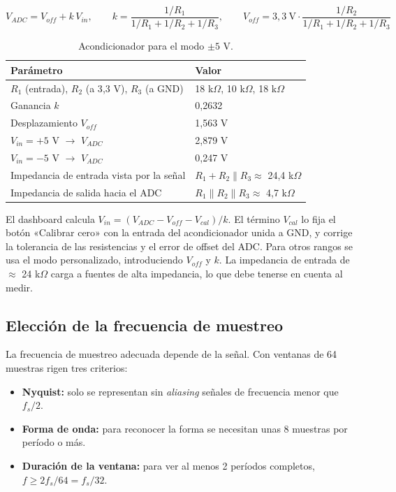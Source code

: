 \documentclass[12pt,a4paper]{article}
\begin{document}
\begin{equation}
V_{ADC} = V_{off} + k\,V_{in}, \qquad
k = \frac{1/R_1}{1/R_1 + 1/R_2 + 1/R_3}, \qquad
V_{off} = 3{,}3\ \text{V}\cdot\frac{1/R_2}{1/R_1 + 1/R_2 + 1/R_3}
\end{equation}

\begin{table}[H]
\centering
\small
\begin{tabular}{@{}p{6.0cm} p{6.0cm}@{}}
\toprule
\textbf{Parámetro} & \textbf{Valor} \\
\midrule
$R_1$ (entrada), $R_2$ (a 3{,}3 V), $R_3$ (a GND) & 18 k$\Omega$, 10 k$\Omega$, 18 k$\Omega$ \\
Ganancia $k$ & 0{,}2632 \\
Desplazamiento $V_{off}$ & 1{,}563 V \\
$V_{in} = +5$ V $\rightarrow$ $V_{ADC}$ & 2{,}879 V \\
$V_{in} = -5$ V $\rightarrow$ $V_{ADC}$ & 0{,}247 V \\
Impedancia de entrada vista por la señal & $R_1 + R_2 \parallel R_3 \approx$ 24{,}4 k$\Omega$ \\
Impedancia de salida hacia el ADC & $R_1 \parallel R_2 \parallel R_3 \approx$ 4{,}7 k$\Omega$ \\
\bottomrule
\end{tabular}
\caption{Acondicionador para el modo $\pm 5$ V.}
\end{table}

El dashboard calcula $V_{in} = (V_{ADC} - V_{off} - V_{cal}) / k$. El término $V_{cal}$ lo fija el botón «Calibrar cero» con la entrada del acondicionador unida a GND, y corrige la tolerancia de las resistencias y el error de offset del ADC. Para otros rangos se usa el modo personalizado, introduciendo $V_{off}$ y $k$. La impedancia de entrada de $\approx$ 24 k$\Omega$ carga a fuentes de alta impedancia, lo que debe tenerse en cuenta al medir.

\subsection{Elección de la frecuencia de muestreo}

La frecuencia de muestreo adecuada depende de la señal. Con ventanas de 64 muestras rigen tres criterios:

\begin{itemize}
  \item \textbf{Nyquist:} solo se representan sin \emph{aliasing} señales de frecuencia menor que $f_s/2$.
  \item \textbf{Forma de onda:} para reconocer la forma se necesitan unas 8 muestras por período o más.
  \item \textbf{Duración de la ventana:} para ver al menos 2 períodos completos, $f \geq 2 f_s / 64 = f_s/32$.
\end{itemize}
\end{document}
